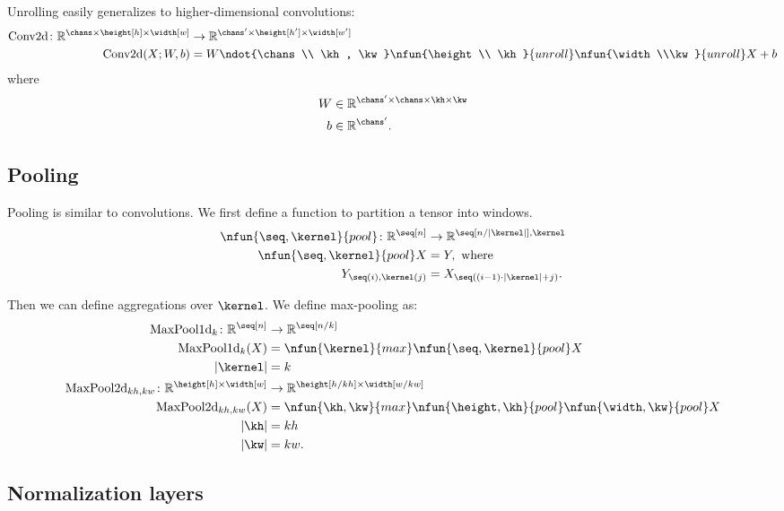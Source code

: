 Unrolling easily generalizes to higher-dimensional convolutions:
\begin{align*}
  \text{Conv2d} \colon \reals^{\chans \times \height[h] \times \width[w]}
  &\rightarrow \reals^{\chans' \times \height[h'] \times \width[w']} \\
  \text{Conv2d}(X; W, b) &= W \ndot{\chans \\ \kh, \kw} \nfun{\height \\ \kh}{unroll} \nfun{\width\\\kw}{unroll} X + b
\end{align*}  
where
\begin{align*}
W &\in \reals^{\chans' \times \chans \times \kh \times \kw} \\
b &\in \reals^{\chans'}.
\end{align*}

\subsection{Pooling}

Pooling is similar to convolutions. 
We first define a function to partition a tensor into windows. 
\begin{align*}
  \nfun{\seq,\kernel}{pool} \colon \reals^{\seq[n]} &\rightarrow \reals^{\seq[n/|\kernel|],\kernel} \\
  \nfun{\seq,\kernel}{pool} X &= Y,\ \text{where} \\
  Y_{\seq(i), \kernel(j)} &= X_{\seq((i-1) \cdot |\kernel| + j)}.
\end{align*}

Then we can define aggregations over $\kernel$. We define max-pooling as: 
\begin{align*}
\text{MaxPool1d}_{k} \colon \mathbb{R}^{\seq[n]} &\rightarrow \mathbb{R}^{\seq[n/k]} \\
\text{MaxPool1d}_{k}(X) &= \nfun{\kernel}{max} \nfun{\seq,\kernel}{pool} X \\
|\kernel| &= k \\
\text{MaxPool2d}_{kh,kw} \colon \mathbb{R}^{\height[h] \times \width[w]} &\rightarrow \mathbb{R}^{\height[h/kh] \times \width[w/kw]} \\
\text{MaxPool2d}_{kh,kw}(X) &= \nfun{\kh,\kw}{max} \nfun{\height,\kh}{pool} \nfun{\width,\kw}{pool} X \\
|\kh| &= kh \\
|\kw| &= kw.
\end{align*}

\subsection{Normalization layers}

